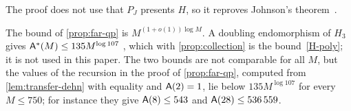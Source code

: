 The proof does not use that $P_J$ presents $H$, so it reproves Johnson's theorem~\cite{Joh99}.

\begin{remark}\label{dehn:rem-compare}
The bound of \cref{prop:far-qp} is $M^{(1+o(1))\log M}$. A doubling endomorphism of $H_3$ gives $\mathsf A^*(M)\le135M^{\log107}$
\cite[Theorem~3.2]{DM-H3}, which with \cref{prop:collection} is the bound~\ref{H-poly}; it is not used in this paper. The two bounds are not
comparable for all $M$, but the values of the recursion in the proof of \cref{prop:far-qp}, computed from \cref{lem:transfer-dehn} with
equality and $\mathsf A(2)=1$, lie below $135M^{\log107}$ for every $M\le750$; for instance they give $\mathsf A(8)\le543$ and
$\mathsf A(28)\le536\,559$.
\end{remark}
